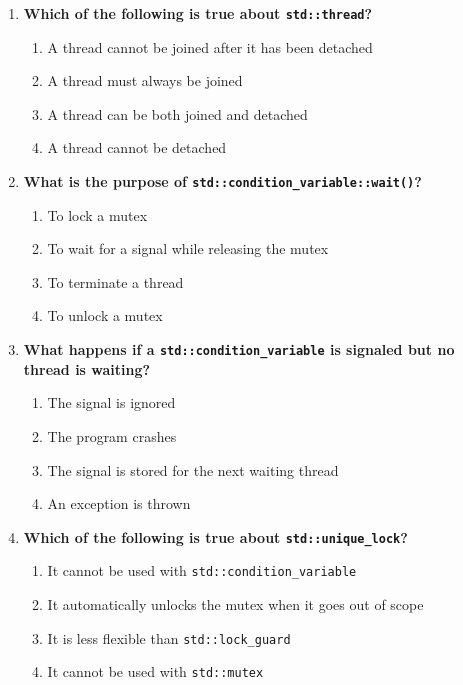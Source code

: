 \documentclass[12pt]{article}
\begin{document}
\begin{enumerate}
    \item \textbf{Which of the following is true about \texttt{std::thread}?}
    \begin{enumerate}[label=(\alph*)]
        \item A thread cannot be joined after it has been detached
        \item A thread must always be joined
        \item A thread can be both joined and detached
        \item A thread cannot be detached
    \end{enumerate}

    \item \textbf{What is the purpose of \texttt{std::condition\_variable::wait()}?}
    \begin{enumerate}[label=(\alph*)]
        \item To lock a mutex
        \item To wait for a signal while releasing the mutex
        \item To terminate a thread
        \item To unlock a mutex
    \end{enumerate}

    \item \textbf{What happens if a \texttt{std::condition\_variable} is signaled but no thread is waiting?}
    \begin{enumerate}[label=(\alph*)]
        \item The signal is ignored
        \item The program crashes
        \item The signal is stored for the next waiting thread
        \item An exception is thrown
    \end{enumerate}

    \item \textbf{Which of the following is true about \texttt{std::unique\_lock}?}
    \begin{enumerate}[label=(\alph*)]
        \item It cannot be used with \texttt{std::condition\_variable}
        \item It automatically unlocks the mutex when it goes out of scope
        \item It is less flexible than \texttt{std::lock\_guard}
        \item It cannot be used with \texttt{std::mutex}
    \end{enumerate}


\end{enumerate}
\end{document}
